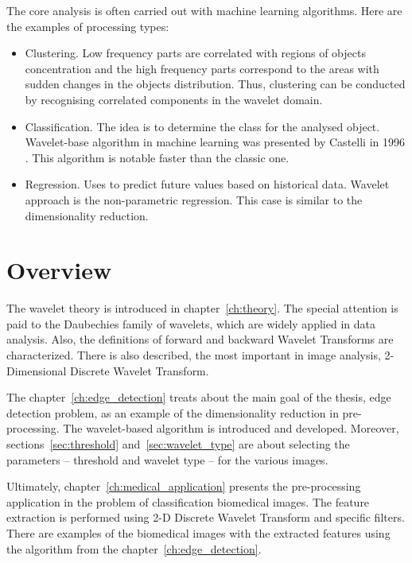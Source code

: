 \noindent The core analysis is often carried out with machine learning algorithms. Here are the examples of processing types:
\begin{itemize}
\item Clustering. Low frequency parts are correlated with regions of objects concentration and the high frequency parts correspond to the areas with sudden changes in the objects distribution. Thus, clustering can be conducted by recognising correlated components in the wavelet domain.

\item Classification. The idea is to determine the class for the analysed object. Wavelet-base algorithm in machine learning was presented by Castelli in 1996 \cite{castelli}. This algorithm is notable faster than the classic one.

\item Regression. Uses to predict future values based on historical data. Wavelet approach is the non-parametric regression. This case is similar to the dimensionality reduction.

\end{itemize}

\section*{Overview}
The wavelet theory is introduced in chapter~\ref{ch:theory}. The special attention is paid to the Daubechies family of wavelets, which are widely applied in data analysis. Also, the definitions of forward and backward Wavelet Transforms are characterized. There is also described, the most important in image analysis, 2-Dimensional Discrete Wavelet Transform.

The chapter~\ref{ch:edge_detection} treats about the main goal of the thesis, edge detection problem, as an example of the dimensionality reduction in pre-processing. The wavelet-based algorithm is introduced and developed. Moreover, sections~\ref{sec:threshold} and~\ref{sec:wavelet_type} are about selecting the parameters -- threshold and wavelet type -- for the various images.

Ultimately, chapter~\ref{ch:medical_application} presents the pre-processing application in the problem of classification biomedical images. The feature extraction is performed using 2-D Discrete Wavelet Transform and specific filters. There are examples of the biomedical images with the extracted features using the algorithm from the chapter~\ref{ch:edge_detection}.





